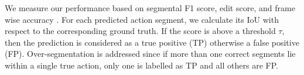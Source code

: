 
We measure our performance based on segmental F1 score, edit score, and frame wise accuracy \cite{8099596}. For each predicted action segment, we calculate its IoU with respect to the corresponding ground truth. If the score is above a threshold $\tau$, then the prediction is considered as a true positive (TP) otherwise a false positive (FP). Over-segmentation is addressed since if more than one correct segments lie within a single true action, only one is labelled as TP and all others are FP.








